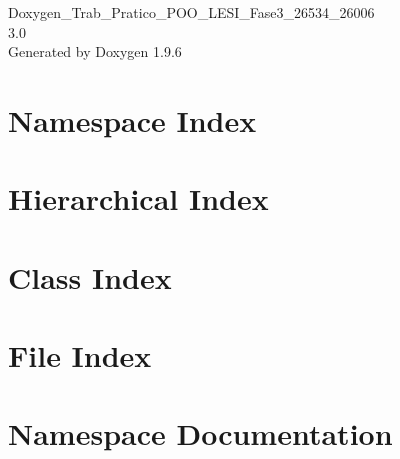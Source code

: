 \documentclass[twoside]{book}
\newcommand{\+}{\discretionary{\mbox{\scriptsize$\hookleftarrow$}}{}{}}
\newcommand{\clearemptydoublepage}{%
    \newpage{\pagestyle{empty}\cleardoublepage}%
  }
\begin{document}
  \raggedbottom
    \hypersetup{pageanchor=false,
                bookmarksnumbered=true,
                pdfencoding=unicode
               }
  \begin{titlepage}
  \vspace*{7cm}
  \begin{center}%
  {\Large Doxygen\+\_\+\+Trab\+\_\+\+Pratico\+\_\+\+POO\+\_\+\+LESI\+\_\+\+Fase3\+\_\+26534\+\_\+26006}\\
  [1ex]\large 3.\+0 \\
  \vspace*{1cm}
  {\large Generated by Doxygen 1.9.6}\\
  \end{center}
  \end{titlepage}
  \clearemptydoublepage
  \tableofcontents
  \clearemptydoublepage
  \hypersetup{pageanchor=true}
\chapter{Namespace Index}

\chapter{Hierarchical Index}

\chapter{Class Index}

\chapter{File Index}

\chapter{Namespace Documentation}








\end{document}
